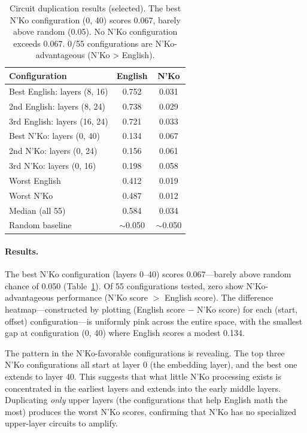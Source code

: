 \documentclass[11pt]{article}
\begin{document}
\begin{table}[t]
\centering
\small
\begin{tabular}{lcc}
\toprule
\textbf{Configuration} & \textbf{English} & \textbf{N'Ko} \\
\midrule
Best English: layers (8, 16) & 0.752 & 0.031 \\
2nd English: layers (8, 24) & 0.738 & 0.029 \\
3rd English: layers (16, 24) & 0.721 & 0.033 \\
Best N'Ko: layers (0, 40) & 0.134 & 0.067 \\
2nd N'Ko: layers (0, 24) & 0.156 & 0.061 \\
3rd N'Ko: layers (0, 16) & 0.198 & 0.058 \\
Worst English & 0.412 & 0.019 \\
Worst N'Ko & 0.487 & 0.012 \\
Median (all 55) & 0.584 & 0.034 \\
Random baseline & ${\sim}$0.050 & ${\sim}$0.050 \\
\bottomrule
\end{tabular}
\caption{Circuit duplication results (selected). The best N'Ko configuration (0, 40) scores 0.067, barely above random (0.05). No N'Ko configuration exceeds 0.067. 0/55 configurations are N'Ko-advantageous (N'Ko > English).}
\label{tab:circuit-dup}
\end{table}

\paragraph{Results.}
The best N'Ko configuration (layers 0--40) scores 0.067---barely above random chance of 0.050 (Table~\ref{tab:circuit-dup}).
Of 55 configurations tested, zero show N'Ko-advantageous performance (N'Ko score $>$ English score).
The difference heatmap---constructed by plotting (English score $-$ N'Ko score) for each (start, offset) configuration---is uniformly pink across the entire space, with the smallest gap at configuration (0, 40) where English scores a modest 0.134.

The pattern in the N'Ko-favorable configurations is revealing.
The top three N'Ko configurations all start at layer 0 (the embedding layer), and the best one extends to layer 40.
This suggests that what little N'Ko processing exists is concentrated in the earliest layers and extends into the early middle layers.
Duplicating \emph{only} upper layers (the configurations that help English math the most) produces the worst N'Ko scores, confirming that N'Ko has no specialized upper-layer circuits to amplify.
\end{document}
